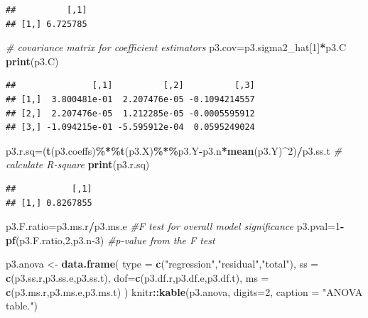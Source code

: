 \documentclass[
]{article}
\newenvironment{Shaded}{\begin{snugshade}}{\end{snugshade}}
\newcommand{\AttributeTok}[1]{\textcolor[rgb]{0.13,0.29,0.53}{#1}}
\newcommand{\CommentTok}[1]{\textcolor[rgb]{0.56,0.35,0.01}{\textit{#1}}}
\newcommand{\DecValTok}[1]{\textcolor[rgb]{0.00,0.00,0.81}{#1}}
\newcommand{\FunctionTok}[1]{\textcolor[rgb]{0.13,0.29,0.53}{\textbf{#1}}}
\newcommand{\NormalTok}[1]{#1}
\newcommand{\OtherTok}[1]{\textcolor[rgb]{0.56,0.35,0.01}{#1}}
\newcommand{\SpecialCharTok}[1]{\textcolor[rgb]{0.81,0.36,0.00}{\textbf{#1}}}
\newcommand{\StringTok}[1]{\textcolor[rgb]{0.31,0.60,0.02}{#1}}
\begin{document}
\begin{verbatim}
##          [,1]
## [1,] 6.725785
\end{verbatim}

\begin{Shaded}
\begin{Highlighting}[]
\CommentTok{\# covariance matrix for coefficient estimators}
\NormalTok{p3.cov}\OtherTok{=}\NormalTok{p3.sigma2\_hat[}\DecValTok{1}\NormalTok{]}\SpecialCharTok{*}\NormalTok{p3.C}
\FunctionTok{print}\NormalTok{(p3.C)}
\end{Highlighting}
\end{Shaded}

\begin{verbatim}
##               [,1]          [,2]          [,3]
## [1,]  3.800481e-01  2.207476e-05 -0.1094214557
## [2,]  2.207476e-05  1.212285e-05 -0.0005595912
## [3,] -1.094215e-01 -5.595912e-04  0.0595249024
\end{verbatim}

\begin{Shaded}
\begin{Highlighting}[]
\NormalTok{p3.r.sq}\OtherTok{=}\NormalTok{(}\FunctionTok{t}\NormalTok{(p3.coeffs)}\SpecialCharTok{\%*\%}\FunctionTok{t}\NormalTok{(p3.X)}\SpecialCharTok{\%*\%}\NormalTok{p3.Y}\SpecialCharTok{{-}}\NormalTok{p3.n}\SpecialCharTok{*}\FunctionTok{mean}\NormalTok{(p3.Y)}\SpecialCharTok{\^{}}\DecValTok{2}\NormalTok{)}\SpecialCharTok{/}\NormalTok{p3.ss.t  }\CommentTok{\# calculate R{-}square}
\FunctionTok{print}\NormalTok{(p3.r.sq)}
\end{Highlighting}
\end{Shaded}

\begin{verbatim}
##           [,1]
## [1,] 0.8267855
\end{verbatim}

\begin{Shaded}
\begin{Highlighting}[]
\NormalTok{p3.F.ratio}\OtherTok{=}\NormalTok{p3.ms.r}\SpecialCharTok{/}\NormalTok{p3.ms.e      }\CommentTok{\#F test for overall model significance}
\NormalTok{p3.pval}\OtherTok{=}\DecValTok{1}\SpecialCharTok{{-}}\FunctionTok{pf}\NormalTok{(p3.F.ratio,}\DecValTok{2}\NormalTok{,p3.n}\DecValTok{{-}3}\NormalTok{)   }\CommentTok{\#p{-}value from the F test}

\NormalTok{p3.anova }\OtherTok{\textless{}{-}} \FunctionTok{data.frame}\NormalTok{(}
   \AttributeTok{type =} \FunctionTok{c}\NormalTok{(}\StringTok{"regression"}\NormalTok{,}\StringTok{"residual"}\NormalTok{,}\StringTok{"total"}\NormalTok{), }
   \AttributeTok{ss =} \FunctionTok{c}\NormalTok{(p3.ss.r,p3.ss.e,p3.ss.t),}
   \AttributeTok{dof=}\FunctionTok{c}\NormalTok{(p3.df.r,p3.df.e,p3.df.t),}
   \AttributeTok{ms =} \FunctionTok{c}\NormalTok{(p3.ms.r,p3.ms.e,p3.ms.t)}
\NormalTok{)}
\NormalTok{knitr}\SpecialCharTok{::}\FunctionTok{kable}\NormalTok{(p3.anova, }\AttributeTok{digits=}\DecValTok{2}\NormalTok{, }\AttributeTok{caption =} \StringTok{"ANOVA table."}\NormalTok{)}
\end{Highlighting}
\end{Shaded}
\end{document}
